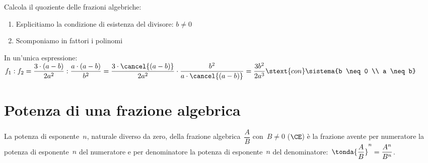 \begin{esempio}{}{}
Calcola il quoziente delle frazioni algebriche:\\

\begin{enumerate} [left=0mm]
\item Esplicitiamo la condizione di esistenza del divisore: \(b \neq 0\)
\item Scomponiamo in fattori i polinomi\\
\end{enumerate}
In un'unica espressione:\\
{\small
\(f_1 : f_2 = 
\dfrac{3\cdot(a-b)}{2a^{2}}:\dfrac{a\cdot(a-b)}{b^2}=
\dfrac{3\cdot\cancel{(a-b)}}{2a^{2}}\cdot
\dfrac{b^2}{a\cdot\cancel{(a-b)}}=\dfrac{3b^2}{2a^3} \stext{ con }
\sistema{b \neq 0 \\ a \neq b}\)}
\end{esempio}


\section{Potenza di una frazione algebrica}
\label{sec:frazalg_potenza}

La potenza di esponente~\(n\), naturale diverso da zero, della frazione 
algebrica~\(\dfrac{A}{B}\) con~\(B{\neq}0\) (\(\CE\)) è la frazione
avente per numeratore la potenza di esponente~\(n\) del numeratore e per 
denominatore la potenza di esponente~\(n\)
del denominatore:~\( \tonda{\dfrac{A}{B}} ^{n}=\dfrac{A^{n}}{B^{n}}\).

